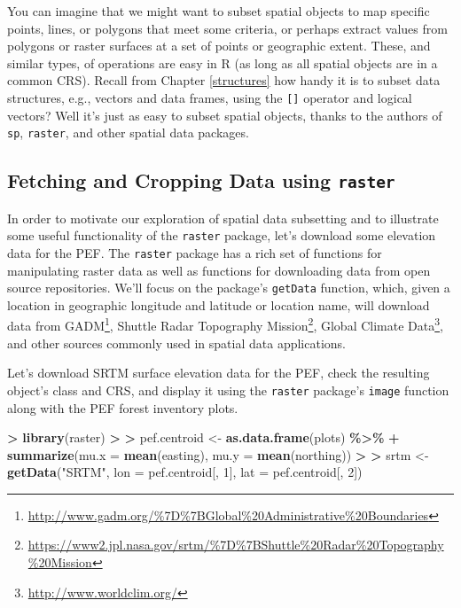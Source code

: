 \documentclass[
]{krantz}
\makeatletter
\newenvironment{Shaded}{\begin{snugshade}}{\end{snugshade}}
\newcommand{\DataTypeTok}[1]{\textcolor[rgb]{0.27,0.27,0.27}{#1}}
\newcommand{\DecValTok}[1]{\textcolor[rgb]{0.06,0.06,0.06}{#1}}
\newcommand{\ErrorTok}[1]{\textcolor[rgb]{0.14,0.14,0.14}{\textbf{#1}}}
\newcommand{\KeywordTok}[1]{\textcolor[rgb]{0.27,0.27,0.27}{\textbf{#1}}}
\newcommand{\NormalTok}[1]{#1}
\newcommand{\OperatorTok}[1]{\textcolor[rgb]{0.43,0.43,0.43}{\textbf{#1}}}
\newcommand{\StringTok}[1]{\textcolor[rgb]{0.5,0.5,0.5}{#1}}
\renewcommand{\href}[2]{#2\footnote{\url{#1}}}
\newenvironment{kframe}{%
\medskip{}
\setlength{\fboxsep}{.8em}
 \def\at@end@of@kframe{}%
 \ifinner\ifhmode%
  \def\at@end@of@kframe{\end{minipage}}%
  \begin{minipage}{\columnwidth}%
 \fi\fi%
 \def\FrameCommand##1{\hskip\@totalleftmargin \hskip-\fboxsep
 \colorbox{shadecolor}{##1}\hskip-\fboxsep
     \hskip-\linewidth \hskip-\@totalleftmargin \hskip\columnwidth}%
 \MakeFramed {\advance\hsize-\width
   \@totalleftmargin\z@ \linewidth\hsize
   \@setminipage}}%
 {\par\unskip\endMakeFramed%
 \at@end@of@kframe}
\renewenvironment{Shaded}{\begin{kframe}}{\end{kframe}}
\makeatother
\begin{document}
You can imagine that we might want to subset spatial objects to map specific points, lines, or polygons that meet some criteria, or perhaps extract values from polygons or raster surfaces at a set of points or geographic extent. These, and similar types, of operations are easy in R (as long as all spatial objects are in a common CRS). Recall from Chapter \ref{structures} how handy it is to subset data structures, e.g., vectors and data frames, using the \texttt{{[}{]}} operator and logical vectors? Well it's just as easy to subset spatial objects, thanks to the authors of \texttt{sp}, \texttt{raster}, and other spatial data packages.

\hypertarget{fetching-and-cropping-data-using-raster}{%
\subsection{\texorpdfstring{Fetching and Cropping Data using \texttt{raster}}{Fetching and Cropping Data using raster}}\label{fetching-and-cropping-data-using-raster}}

In order to motivate our exploration of spatial data subsetting and to illustrate some useful functionality of the \texttt{raster} package, let's download some elevation data for the PEF. The \texttt{raster} package has a rich set of functions for manipulating raster data as well as functions for downloading data from open source repositories. We'll focus on the package's \texttt{getData} function, which, given a location in geographic longitude and latitude or location name, will download data from \href{http://www.gadm.org/\%7D\%7BGlobal\%20Administrative\%20Boundaries}{GADM}, \href{https://www2.jpl.nasa.gov/srtm/\%7D\%7BShuttle\%20Radar\%20Topography\%20Mission}{Shuttle Radar Topography Mission}, \href{http://www.worldclim.org/}{Global Climate Data}, and other sources commonly used in spatial data applications.

Let's download SRTM surface elevation data for the PEF, check the resulting object's class and CRS, and display it using the \texttt{raster} package's \texttt{image} function along with the PEF forest inventory plots.

\begin{Shaded}
\begin{Highlighting}[]
\OperatorTok{\textgreater{}}\StringTok{ }\KeywordTok{library}\NormalTok{(raster)}
\OperatorTok{\textgreater{}}\StringTok{ }
\ErrorTok{\textgreater{}}\StringTok{ }\NormalTok{pef.centroid \textless{}{-}}\StringTok{ }\KeywordTok{as.data.frame}\NormalTok{(plots) }\OperatorTok{\%\textgreater{}\%}\StringTok{ }
\OperatorTok{+}\StringTok{     }\KeywordTok{summarize}\NormalTok{(}\DataTypeTok{mu.x =} \KeywordTok{mean}\NormalTok{(easting), }\DataTypeTok{mu.y =} \KeywordTok{mean}\NormalTok{(northing))}
\OperatorTok{\textgreater{}}\StringTok{ }
\ErrorTok{\textgreater{}}\StringTok{ }\NormalTok{srtm \textless{}{-}}\StringTok{ }\KeywordTok{getData}\NormalTok{(}\StringTok{"SRTM"}\NormalTok{, }\DataTypeTok{lon =}\NormalTok{ pef.centroid[, }\DecValTok{1}\NormalTok{], }\DataTypeTok{lat =}\NormalTok{ pef.centroid[, }\DecValTok{2}\NormalTok{])}
\end{Highlighting}
\end{Shaded}
\end{document}
